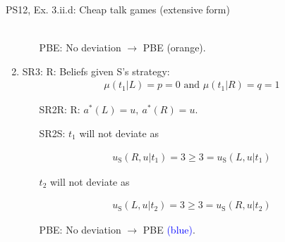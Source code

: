 \begin{frame}{PS12, Ex. 3.ii.d: Cheap talk games (extensive form)}
\begin{multicols}{2}
\begin{enumerate}
\begin{align*}
        \end{align*}\vspace{-18pt}
        \begin{itemize}\normalsize
          \item[PBE:] No deviation $\rightarrow$ PBE \textcolor{YellowOrange}{(orange)}.
        \end{itemize}
        \item SR3: R: Beliefs given S's strategy:\vspace{-8pt}
        \begin{align*}
          \mu(t_1|L)=p=0\text{ and }\mu(t_1|R)=q=1
        \end{align*}\vspace{-18pt}
        \begin{itemize}\normalsize
          \item[SR2R:] R: $a^*(L)=u,\ a^*(R)=u$.
          \item[SR2S:] $t_1$ will not deviate as
        \end{itemize}\vspace{-10pt}
        \begin{align*}
          u_\text{S}(R,u|t_1)=3\geq 3=u_\text{S}(L,u|t_1)
        \end{align*}\vspace{-18pt}
        \begin{itemize}\normalsize
          \item[] $t_2$ will not deviate as
        \end{itemize}\vspace{-10pt}
        \begin{align*}
          u_\text{S}(L,u|t_2)=3\geq3=u_\text{S}(R,u|t_2)
        \end{align*}\vspace{-18pt}
        \begin{itemize}\normalsize
          \item[PBE:] No deviation $\rightarrow$ PBE \textcolor{blue}{(blue)}.
        \end{itemize}
      \end{enumerate}
      \vfill\null
    \end{multicols}
\end{frame}
